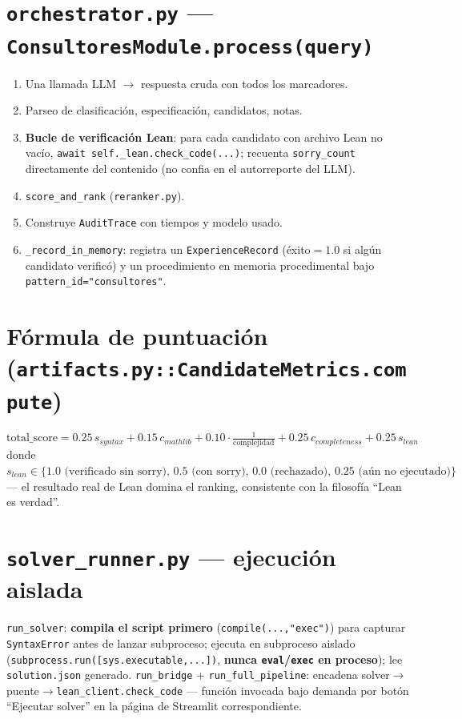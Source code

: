 \documentclass[11pt,a4paper]{report}
\newcommand{\code}[1]{\texttt{#1}}
\begin{document}
\section{\code{orchestrator.py} --- \code{ConsultoresModule.process(query)}}

\begin{enumerate}
  \item Una llamada LLM $\to$ respuesta cruda con todos los marcadores.
  \item Parseo de clasificaci\'on, especificaci\'on, candidatos, notas.
  \item \textbf{Bucle de verificaci\'on Lean}: para cada candidato con archivo Lean no vac\'io, \code{await self.\_lean.check_code(...)}; recuenta \code{sorry\_count} directamente del contenido (no confia en el autorreporte del LLM).
  \item \code{score_and_rank} (\code{reranker.py}).
  \item Construye \code{AuditTrace} con tiempos y modelo usado.
  \item \code{\_record_in_memory}: registra un \code{ExperienceRecord} (\'exito$=1.0$ si alg\'un candidato verific\'o) y un procedimiento en memoria procedimental bajo \code{pattern\_id="consultores"}.
\end{enumerate}

\section{F\'ormula de puntuaci\'on (\code{artifacts.py::CandidateMetrics.compute})}
\[
\text{total\_score}=0.25\,s_{syntax}+0.15\,c_{mathlib}+0.10\cdot\tfrac{1}{\text{complejidad}}+0.25\,c_{completeness}+0.25\,s_{lean}
\]
donde $s_{lean}\in\{1.0\text{ (verificado sin sorry)},\,0.5\text{ (con sorry)},\,0.0\text{ (rechazado)},\,0.25\text{ (a\'un no ejecutado)}\}$ --- el resultado real de Lean domina el ranking, consistente con la filosof\'ia ``Lean es verdad''.

\section{\code{solver_runner.py} --- ejecuci\'on aislada}

\code{run_solver}: \textbf{compila el script primero} (\code{compile(...,"exec")}) para capturar \code{SyntaxError} antes de lanzar subproceso; ejecuta en subproceso aislado (\code{subprocess.run([sys.executable,...])}, \textbf{nunca \code{eval}/\code{exec} en proceso}); lee \code{solution.json} generado. \code{run_bridge} + \code{run_full_pipeline}: encadena solver$\to$puente$\to$\code{lean_client.check_code} --- funci\'on invocada bajo demanda por bot\'on ``Ejecutar solver'' en la p\'agina de Streamlit correspondiente.
\end{document}
